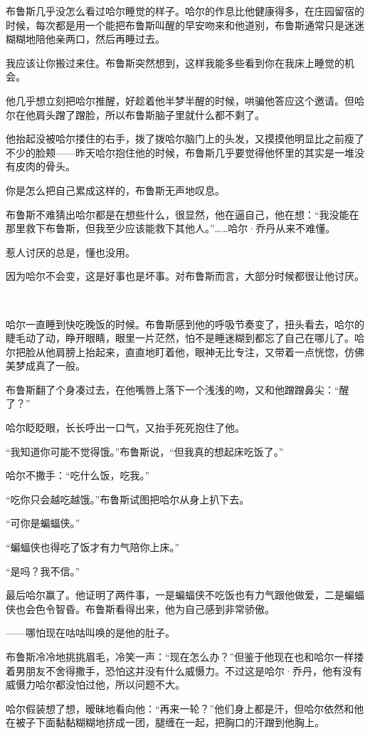\documentclass[../main]{subfiles}
\begin{document}
布鲁斯几乎没怎么看过哈尔睡觉的样子。哈尔的作息比他健康得多，在庄园留宿的时候，每次都是用一个能把布鲁斯叫醒的早安吻来和他道别，布鲁斯通常只是迷迷糊糊地陪他亲两口，然后再睡过去。

我应该让你搬过来住。布鲁斯突然想到，这样我能多些看到你在我床上睡觉的机会。

他几乎想立刻把哈尔推醒，好趁着他半梦半醒的时候，哄骗他答应这个邀请。但哈尔在他肩头蹭了蹭脸，所以布鲁斯脑子里就什么都不剩了。

他抬起没被哈尔搂住的右手，拨了拨哈尔脑门上的头发，又摸摸他明显比之前瘦了不少的脸颊——昨天哈尔抱住他的时候，布鲁斯几乎要觉得他怀里的其实是一堆没有皮肉的骨头。

你是怎么把自己累成这样的，布鲁斯无声地叹息。

布鲁斯不难猜出哈尔都是在想些什么，很显然，他在逼自己，他在想：“我没能在那里救下布鲁斯，但我至少应该能救下其他人。”……哈尔·乔丹从来不难懂。

惹人讨厌的总是，懂也没用。

因为哈尔不会变，这是好事也是坏事。对布鲁斯而言，大部分时候都很让他讨厌。

~\

哈尔一直睡到快吃晚饭的时候。布鲁斯感到他的呼吸节奏变了，扭头看去，哈尔的睫毛动了动，睁开眼睛，眼里一片茫然，怕不是睡迷糊到都忘了自己在哪儿了。哈尔把脸从他肩膀上抬起来，直直地盯着他，眼神无比专注，又带着一点恍惚，仿佛美梦成真了一般。

布鲁斯翻了个身凑过去，在他嘴唇上落下一个浅浅的吻，又和他蹭蹭鼻尖：“醒了？”

哈尔眨眨眼，长长呼出一口气，又抬手死死抱住了他。

“我知道你可能不觉得饿。”布鲁斯说，“但我真的想起床吃饭了。”

哈尔不撒手：“吃什么饭，吃我。”

“吃你只会越吃越饿。”布鲁斯试图把哈尔从身上扒下去。

“可你是蝙蝠侠。”

“蝙蝠侠也得吃了饭才有力气陪你上床。”

“是吗？我不信。”

最后哈尔赢了。他证明了两件事，一是蝙蝠侠不吃饭也有力气跟他做爱，二是蝙蝠侠也会色令智昏。布鲁斯看得出来，他为自己感到非常骄傲。

——哪怕现在咕咕叫唤的是他的肚子。

布鲁斯冷冷地挑挑眉毛，冷笑一声：“现在怎么办？”但鉴于他现在也和哈尔一样搂着男朋友不舍得撒手，恐怕这并没有什么威慑力。不过这是哈尔·乔丹，他有没有威慑力哈尔都没怕过他，所以问题不大。

哈尔假装想了想，暧昧地看向他：“再来一轮？”他们身上都是汗，但哈尔依然和他在被子下面黏黏糊糊地挤成一团，腿缠在一起，把胸口的汗蹭到他胸上。
\end{document}
